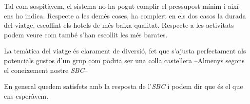 \documentclass[11pt,a4paper]{article}
\begin{document}
Tal com sospitàvem, el sistema no ha pogut complir el pressupost mínim i així ens ho indica. Respecte a les demés coses, ha complert en els dos casos la durada del viatge, escollint els hotels de més baixa qualitat. Respecte a les activitats podem veure com també s'han escollit les més barates.

La temàtica del viatge és clarament de diversió, fet que s'ajusta perfectament als potencials gustos d'un grup com podria ser una colla castellera --Almenys segons el coneixement nostre \emph{SBC}--

En general quedem satisfets amb la resposta de l'\emph{SBC} i podem dir que és el que ens esperàvem.
\end{document}

